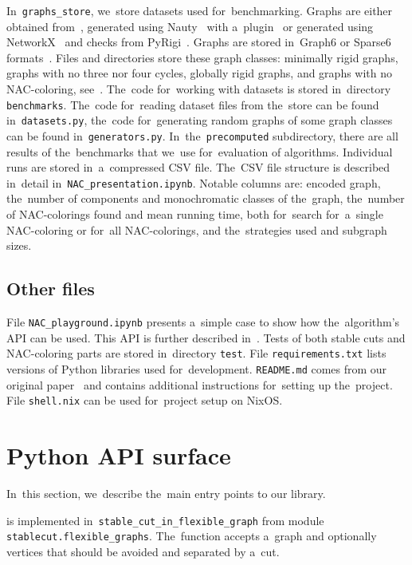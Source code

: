 In~\texttt{graphs\_store}, we~store datasets used for~benchmarking.
Graphs are either obtained from~\cite{extremal_graphs},
generated using Nauty~\cite{nauty} with a~plugin~\cite{nauty_plugin}
or generated using NetworkX~\cite{networkx} and checks from PyRigi~\cite{pyrigi}.
Graphs are stored in~Graph6 or Sparse6 formats~\cite{graph6}.
%
Files and directories store these graph classes:
minimally rigid graphs, graphs with no three nor four cycles, globally rigid graphs,
and graphs with no NAC-coloring, see~.
%
The~code for~working with datasets is stored in~directory \texttt{benchmarks}.
The~code for~reading dataset files from the~store can be found in~\texttt{datasets.py},
the~code for~generating random graphs of some graph classes
can be found in~\texttt{generators.py}.
%
In~the~\texttt{precomputed} subdirectory, there are all results of the~benchmarks that
we~use for~evaluation of algorithms.
Individual runs are stored in~a~compressed CSV file.
The~CSV file structure is described in~detail in~\texttt{NAC\_presentation.ipynb}.
Notable columns are:
encoded graph,
the~number of \trcon{} components and monochromatic classes of the~graph,
the~number of NAC-colorings found and mean running time,
both for~search for~a~single NAC-coloring or for~all NAC-colorings,
and the~strategies used and subgraph sizes.


\subsection{Other files}

File \texttt{NAC\_playground.ipynb} presents a~simple case
to show how the~algorithm's API can be used.
This API is further described in~.
%
Tests of both stable cuts and NAC-coloring parts are stored in~directory \texttt{test}.
%
File \texttt{requirements.txt} lists versions of Python libraries used for~development.
\texttt{README.md} comes from our original paper~\cite{my_paper}
and contains additional instructions for~setting up the~project.
File \texttt{shell.nix} can be used for~project setup on NixOS\@.


\section{Python API surface}%
\label{sec:impl_python_api}

In~this section,
we~describe the~main entry points to our library.

is implemented in~\texttt{stable\_cut\_in\_flexible\_graph}
from module \texttt{stablecut.flexible\_graphs}.
The~function accepts a~graph and
optionally vertices that should be avoided and separated by a~cut.

